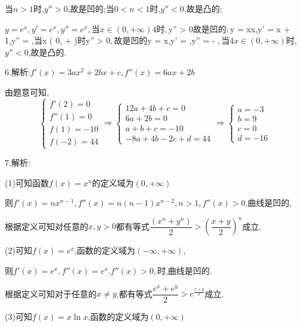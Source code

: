 当$n > 1$时,$y'' > 0$,故是凹的;当$0 < n < 1$时,$y'' < 0$,故是凸的;

$y = {e^x},y' = {e^x},y'' = {e^x},$当$x \in \left( {0, + \infty } \right)4时,$y'' > 0$故是凹的;

$y = x\ln x,y' = \ln x + 1,y'' = ,$当$x \in \left( {0, + \infty } \right)$时$y'' > 0$,故是凹的

$y = \ln x,y' = ,y'' =  - $,当4x \in \left( {0, + \infty } \right)$时,$y'' < 0$,故是凸的.

6.解析:$f'\left( x \right) = 3a{x^2} + 2bx + c,f''\left( x \right) = 6ax + 2b$

 由题意可知,\[\left\{ {\begin{array}{*{20}{c}}
{f'(2) = 0}\\
{f''(1) = 0}\\
{f(1) =  - 10}\\
{f( - 2) = 44}
\end{array} \Rightarrow \left\{ {\begin{array}{*{20}{c}}
{12a + 4b + c = 0}\\
{6a + 2b = 0}\\
{a + b + c =  - 10}\\
{ - 8a + 4b - 2c + d = 44}
\end{array} \Rightarrow \left\{ {\begin{array}{*{20}{c}}
{a =  - 3}\\
{b = 9}\\
{c = 0}\\
{d =  - 16}
\end{array}} \right.} \right.} \right.\]

7.解析:

(1)可知函数$f(x) = {x^n}$的定义域为$(0, + \infty )$

则$f'(x) = n{x^{n - 1}},f''(x) = n(n - 1){x^{n - 2}},n > 1,f''(x) > 0$,曲线是凹的,

根据定义可知对任意的$x,y > 0$都有等式$\dfrac{{({x^n} + {y^n})}}{2} > {\left( {\dfrac{{x + y}}{2}} \right)^n}$成立.

(2)可知$f(x) = {e^x}$,函数的定义域为$\left( { - \infty , + \infty } \right)$,

则$f'(x) = {e^x},f''(x) = {e^x}.f''(x) > 0,$时,曲线是凹的.

根据定义可知对于任意的$x \ne y$,都有等式$\dfrac{{{e^x} + {e^y}}}{2} > {e^{\frac{{x + y}}{2}}}$成立.

(3)可知$f(x) = x\ln x$,函数的定义域为$\left( {0, + \infty } \right)$

